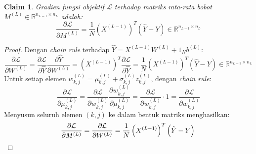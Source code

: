 \documentclass[11pt,a4paper]{article}
\def\mathbf#1{#1}%
\theoremstyle{plain}
\newtheorem{claim}{Claim}[section]
\theoremstyle{definition}
\theoremstyle{remark}
\begin{document}
\begin{claim}
Gradien fungsi objektif $\mathcal{L}$ terhadap matriks rata-rata bobot $M^{(L)} \in \mathbb{R}^{n_{L-1} \times n_L}$ adalah:
\begin{equation}
    \frac{\partial \mathcal{L}}{\partial M^{(L)}} = \frac{1}{N} \left( X^{(L-1)} \right)^T \left( \hat{Y} - Y \right) \in \mathbb{R}^{n_{L-1} \times n_L} \label{eq:grad_ML}
\end{equation}
\end{claim}
\begin{proof}
Dengan \textit{chain rule} terhadap $\hat{Y} = X^{(L-1)} W^{(L)} + \mathbf{1}_N \mathbf{b}^{(L)}$:
\begin{equation}
    \frac{\partial \mathcal{L}}{\partial W^{(L)}} = \frac{\partial \mathcal{L}}{\partial \hat{Y}} \frac{\partial \hat{Y}}{\partial W^{(L)}} = \left( X^{(L-1)} \right)^T \frac{\partial \mathcal{L}}{\partial \hat{Y}} = \frac{1}{N} \left( X^{(L-1)} \right)^T \left( \hat{Y} - Y \right) \in \mathbb{R}^{n_{L-1} \times n_L} \label{eq:dL_dWL_reparam}
\end{equation}
Untuk setiap elemen $w^{(L)}_{k, j} = \mu^{(L)}_{k, j} + \sigma^{(L)}_{k, j} z^{(L)}_{k, j}$, dengan \textit{chain rule}:
\begin{equation}
    \frac{\partial \mathcal{L}}{\partial \mu^{(L)}_{k, j}} = \frac{\partial \mathcal{L}}{\partial w^{(L)}_{k, j}} \frac{\partial w^{(L)}_{k, j}}{\partial \mu^{(L)}_{k, j}} = \frac{\partial \mathcal{L}}{\partial w^{(L)}_{k, j}} \cdot 1 = \frac{\partial \mathcal{L}}{\partial w^{(L)}_{k, j}}
\end{equation}
Menyusun seluruh elemen $(k, j)$ ke dalam bentuk matriks menghasilkan:
\begin{equation}
    \frac{\partial \mathcal{L}}{\partial M^{(L)}} = \frac{\partial \mathcal{L}}{\partial W^{(L)}} = \frac{1}{N} \left( X^{(L-1)} \right)^T \left( \hat{Y} - Y \right) \qedhere
\end{equation}
\end{proof}
\end{document}
